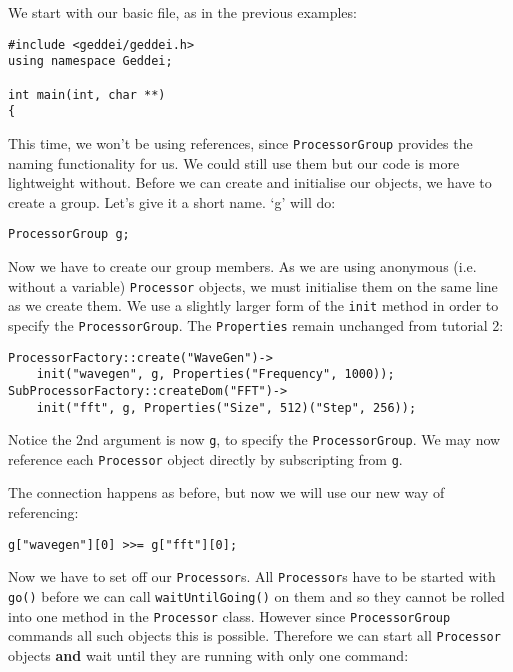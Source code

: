 We start with our basic file, as in the previous examples:

\begin{verbatim}
#include <geddei/geddei.h>
using namespace Geddei;

int main(int, char **)
{
\end{verbatim}

This time, we won't be using references, since \texttt{ProcessorGroup} provides the naming functionality for us. We could still use them but our code is more lightweight without. Before we can create and initialise our objects, we have to create a group. Let's give it a short name. `g' will do:

\begin{verbatim}
ProcessorGroup g;
\end{verbatim}

Now we have to create our group members. As we are using anonymous (i.e. without a variable) \texttt{Processor} objects, we must initialise them on the same line as we create them. We use a slightly larger form of the \texttt{init} method in order to specify the \texttt{ProcessorGroup}. The \texttt{Properties} remain unchanged from tutorial 2:

\begin{verbatim}
ProcessorFactory::create("WaveGen")->
    init("wavegen", g, Properties("Frequency", 1000));
SubProcessorFactory::createDom("FFT")->
    init("fft", g, Properties("Size", 512)("Step", 256));
\end{verbatim}

Notice the 2nd argument is now \texttt{g}, to specify the \texttt{ProcessorGroup}. We may now reference each \texttt{Processor} object directly by subscripting from \texttt{g}.

The connection happens as before, but now we will use our new way of referencing:

\begin{verbatim}
g["wavegen"][0] >>= g["fft"][0];
\end{verbatim}

Now we have to set off our \texttt{Processor}s. All \texttt{Processor}s have to be started with \texttt{go()} before we can call \texttt{waitUntilGoing()} on them and so they cannot be rolled into one method in the \texttt{Processor} class. However since \texttt{ProcessorGroup} commands all such objects this is possible. Therefore we can start all \texttt{Processor} objects \textbf{and} wait until they are running with only one command:

